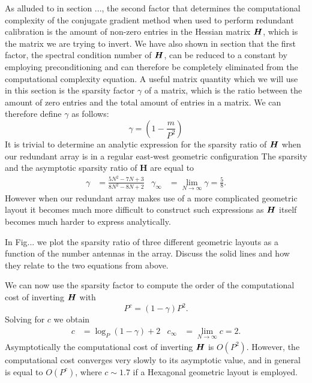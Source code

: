 \documentclass[useAMS,usenatbib]{mn2e}
\newcommand{\bH}{\bmath{H}}
\begin{document}
As alluded to in section ..., the second factor that determines the computational complexity of the conjugate gradient method when used to perform redundant calibration is the amount of non-zero
entries in the Hessian matrix $\bH$, which is the matrix we are trying to invert. We have also shown in section that the first factor, the spectral condition number of $\bH$, can be reduced 
to a constant by employing preconditioning and can therefore be completely eliminated from the computational complexity equation. A useful matrix quantity
which we will use in this section is the sparsity factor $\gamma$ of a matrix, which is the ratio between the amount of zero entries and the total amount of entries in a matrix. We 
can therefore define $\gamma$ as follows:
\begin{equation}
 \gamma = \left (1 - \frac{m}{P^2} \right ) 
\end{equation}
It is trivial to determine an analytic expression for the sparsity ratio of $\bH$ when our redundant array is in a regular east-west geometric configuration
The sparsity and the asymptotic sparsity ratio of $\boldsymbol{H}$ are equal to
\begin{align}
\gamma &= \frac{5N^2-7N+3}{8N^2-8N+2} & \gamma_{\infty} &= \lim_{N\rightarrow \infty}\gamma = \frac{5}{8} \label{eq:gamma}. 
\end{align}
However when our redundant array makes use of a more complicated geometric layout it becomes much more difficult to construct such expressions as $\bH$ itself 
becomes much harder to express analytically. 

In Fig... we plot the sparsity ratio of three different geometric layouts as a function of the number antennas in the array. Discuss the solid lines 
and how they relate to the two equations from above.

We can now use the sparsity factor to compute the order of the computational cost of inverting $\bH$ with
\begin{equation}
P^{c} = (1 - \gamma)P^2.
\end{equation}
Solving for $c$ we obtain
\begin{align}
c &= \log_{P}(1 - \gamma) + 2 & c_{\infty} &= \lim_{N\rightarrow \infty} c = 2. \label{eq:c}
\end{align}
Asymptotically the computational cost of inverting $\bH$ is $O(P^2)$. However, the computational cost converges 
very slowly to its asymptotic value, and in general is equal to $O(P^{c})$, where $c \sim 1.7$ if a Hexagonal geometric layout is employed.
\end{document}
